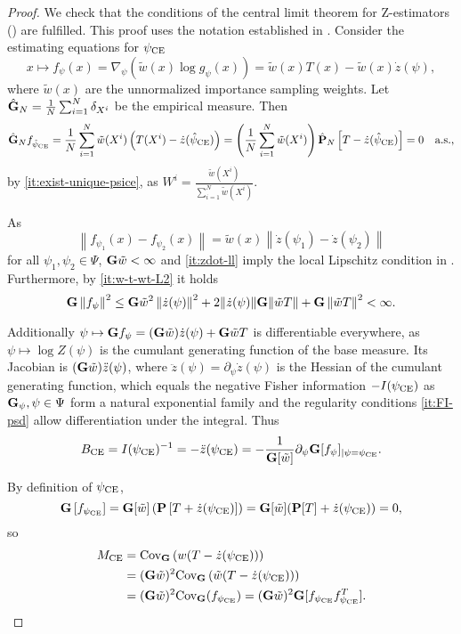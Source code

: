 \begin{proof} We check that the conditions of the central limit theorem for Z-estimators () are fulfilled. This proof uses the notation established in . Consider the estimating equations for ${\psi_{\text{CE}}}$ 
    $$x\mapsto f_\psi(x) = \nabla_{\psi} \left(\tilde w(x)\log g_{\psi}(x)\right) = \tilde w(x) T(x) - \tilde w(x) \dot z (\psi),$$ where $\tilde w(x)$ are the unnormalized importance sampling weights. 
    Let $\hat{\mathbf G}_{N} = \frac{1}{N} \sum_{i = 1}^N \delta_{X^{i}}$ be the empirical measure. Then 
    \begin{align*}
    \hat {\mathbf G}_{N} f_{{\hat\psi_{\text{CE}}}} = \frac{1}{N} \sum_{i = 1}^N \tilde w(X^{i}) \left( T(X^{i}) - \dot z ({\hat\psi_{\text{CE}}})\right) = \left(\frac{1}{N}\sum_{i=1}^N \tilde w(X^{i})\right) \hat {\mathbf P}_{N} \left[T - \dot z({\hat\psi_{\text{CE}}})\right] = 0 && \text{a.s.},
    \end{align*}
    by \ref{it:exist-unique-psice}, as $W^{i} = \frac{\tilde w(X^{i})}{\sum_{i=1}^N \tilde w(X^{i})}$. 
    
    As $$\left\lVert f_{\psi_1}(x) - f_{\psi_2}(x)\right\rVert = \tilde w(x) \left\lVert \dot z (\psi_1) - \dot z(\psi_2)\right\rVert$$ for all $\psi_{1}, \psi_{2}\in \Psi$,  $\mathbf G \tilde w < \infty $ and \ref{it:zdot-ll} imply the local Lipschitz condition  in .
    Furthermore, by \ref{it:w-t-wt-L2} it holds
    $$
    \mathbf G \left\lVert f_\psi \right\rVert^2 \leq \mathbf G \tilde w^2 \left\lVert \dot z(\psi) \right\rVert ^2  + 2 \lVert \dot z(\psi) \rVert \mathbf G \lVert \tilde wT\rVert + \mathbf G \left\lVert \tilde wT\right\rVert^2 < \infty.
    $$

    Additionally $\psi \mapsto\mathbf G f_\psi = (\mathbf G \tilde w) \dot z (\psi) + \mathbf G \tilde wT$ is differentiable everywhere, as $\psi \mapsto \log Z(\psi)$ is the cumulant generating function of the base measure. Its Jacobian is $(\mathbf G \tilde w) \ddot z(\psi)$, where  $\ddot z(\psi) = \partial_\psi \dot z(\psi)$ is the Hessian of the cumulant generating function, which equals the negative Fisher information $-I({\psi_{\text{CE}}})$ as $\mathbf G_{\psi}, \psi \in \Psi$ form a natural exponential family and the regularity conditions \ref{it:FI-psd} allow differentiation under the integral. Thus 
    $$
        B_{{\text{CE}}} = I({\psi_{\text{CE}}})^{-1} = -\ddot z({\psi_{\text{CE}}}) = - \frac{1}{\mathbf G[\tilde w]} \partial_{\psi} \mathbf G [f_{\psi}]_{\vert \psi = {\psi_{\text{CE}}}}.
    $$
    
    By definition of ${\psi_{\text{CE}}}$,
    $$
    \mathbf G \left[ f_{{\psi_{\text{CE}}}} \right] = \mathbf G[\tilde w] \left(\mathbf P \left[ T + \dot z({\psi_{\text{CE}}}) \right]\right) = \mathbf G[\tilde w](\mathbf P [T] + \dot z ({\psi_{\text{CE}}})) = 0,
    $$
    so 
    \begin{align*}
        M_{{\text{CE}}} &= \text{Cov}_{\mathbf G} \left( w (T - \dot z ({\psi_{\text{CE}}})) \right) \\
        &= (\mathbf G \tilde w)^{2}\text{Cov}_{\mathbf G} \left( \tilde w(T - \dot z ({\psi_{\text{CE}}})) \right) \\
        &= (\mathbf G \tilde w)^{2}\text{Cov}_{\mathbf G}(f_{{\psi_{\text{CE}}}}) = (\mathbf G \tilde w)^{2}\mathbf G [f_{{\psi_{\text{CE}}}}f_{{\psi_{\text{CE}}}}^{T}].
    \end{align*}


\end{proof}
